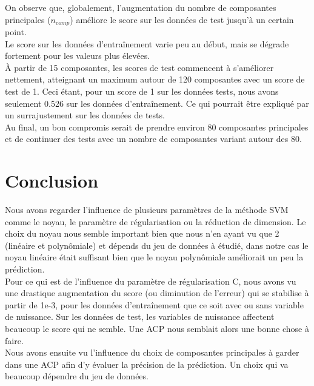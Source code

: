 \documentclass{article}
\begin{document}
On observe que, globalement, l'augmentation du nombre de composantes principales ($n_{comp}$) améliore le score sur les données de test jusqu'à un certain point.\\
Le score sur les données d'entraînement varie peu au début, mais se dégrade fortement pour les valeurs plus élevées.\\

À partir de 15 composantes, les scores de test commencent à s'améliorer nettement, atteignant un maximum autour de 120 composantes avec un score de test de 1. Ceci étant, pour un score de 1 sur les données tests, nous avons seulement 0.526 sur les données d'entraînement. Ce qui pourrait être expliqué par un surrajustement sur les données de tests.\\

Au final, un bon compromis serait de prendre environ 80 composantes principales et de continuer des tests avec un nombre de composantes variant autour des 80. 


\section{Conclusion}
Nous avons regarder l'influence de plusieurs paramètres de la méthode SVM comme le noyau, le paramètre de régularisation ou la réduction de dimension. Le choix du noyau nous semble important bien que nous n'en ayant vu que 2 (linéaire et polynômiale) et dépends du jeu de données à étudié, dans notre cas le noyau linéaire était suffisant bien que le noyau polynômiale améliorait un peu la prédiction.\\

Pour ce qui est de l'influence du paramètre de régularisation C, nous avons vu une drastique augmentation du score (ou diminution de l'erreur) qui se stabilise à partir de 1e-3, pour les données d'entraînement que ce soit avec ou sans variable de nuissance. Sur les données de test, les variables de nuissance affectent beaucoup le score qui ne semble. Une ACP nous semblait alors une bonne chose à faire.\\

Nous avons ensuite vu l'influence du choix de composantes principales à garder dans une ACP afin d'y évaluer la précision de la prédiction. Un choix qui va beaucoup dépendre du jeu de données. 
\end{document}
